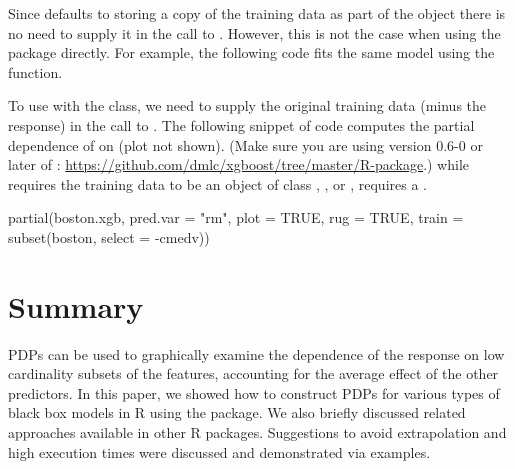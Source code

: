 Since  defaults to storing a copy of the training data as part of the  object there is no need to supply it in the call to . However, this is not the case when using the  package directly. For example, the following code fits the same model using the  function.
To use  with the  class, we need to supply the original training data (minus the response) in the call to . The following snippet of code computes the partial dependence of  on  (plot not shown). (Make sure you are using version 0.6-0 or later of : \url{https://github.com/dmlc/xgboost/tree/master/R-package}.)  while  requires the training data to be an object of class , , or ,  requires a .
\begin{example}
partial(boston.xgb, pred.var = "rm", plot = TRUE, rug = TRUE,
        train = subset(boston, select = -cmedv))
\end{example}


\section{Summary}

PDPs can be used to graphically examine the dependence of the response on low cardinality subsets of the features, accounting for the average effect of the other predictors. In this paper, we showed how to construct PDPs for various types of black box models in R using the  package. We also briefly discussed related approaches available in other R packages. Suggestions to avoid extrapolation and high execution times were discussed and demonstrated via examples.

